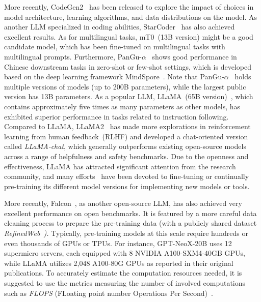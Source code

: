 {More recently, CodeGen2~\cite{Nijkamp-2023-codegen2-arxiv} has been released to explore the impact of choices in model architecture, learning algorithms, and data distributions on the model. As another LLM specialized in coding abilities, StarCoder~\cite{Li-2023-arxiv-Starcoder} has also achieved excellent results. 
As for multilingual tasks, mT0~(13B version) might be a good candidate model, which has been fine-tuned on multilingual tasks with multilingual prompts. 
{Furthermore, PanGu-$\alpha$~\cite{Zeng-arxiv-2021-PanGualpha} shows good performance in Chinese downstream tasks in zero-shot or few-shot settings, which is developed  based on the deep learning framework MindSpore~\cite{Huawei-Springer-2022-MindSpore}. 
Note that PanGu-$\alpha$~\cite{Zeng-arxiv-2021-PanGualpha} holds multiple versions of models (up to 200B parameters), while the largest public version has 13B parameters.  }
As a popular LLM, LLaMA~(65B version)~\cite{Touvron-arxiv-2023-LLaMA}, which contains approximately five times as many parameters as other models, has exhibited superior performance in tasks related to instruction following.  %
{Compared to LLaMA, LLaMA2~\cite{Touvron-2023-llama2-arxiv} has made more explorations in reinforcement learning from human feedback~(RLHF) and developed a chat-oriented version called \emph{LLaMA-chat}, which generally outperforms existing open-source models across a range of helpfulness and safety benchmarks.}
{Due to the openness and effectiveness, 
LLaMA has attracted significant attention from the research community, and many efforts~\cite{alpaca, vicuna2023, ChatLLaMA, ColossalChat} have been devoted to fine-tuning or continually pre-training its different model versions  for implementing new models or tools. }  {More recently, {Falcon~\cite{Falcon40b}}, as another open-source LLM, has also achieved very excellent  performance on open benchmarks. It is featured by a more careful data cleaning process to prepare the pre-training data (with a publicly shared dataset \emph{RefinedWeb~\cite{Penedo-2023-arxiv-Refinedweb}). }
Typically, pre-training  models at this scale  require hundreds or even thousands of GPUs or TPUs. For instance, GPT-NeoX-20B uses 12 supermicro servers, each equipped with 8 NVIDIA A100-SXM4-40GB GPUs, while LLaMA utilizes 2,048 A100-80G GPUs as reported in their original publications. To accurately estimate the computation resources needed, it is suggested to use the metrics measuring the number of involved computations such as \emph{FLOPS} (\ie FLoating point number Operations Per Second)~\cite{Kaplan-arxiv-2020-Scaling}. 


}}
